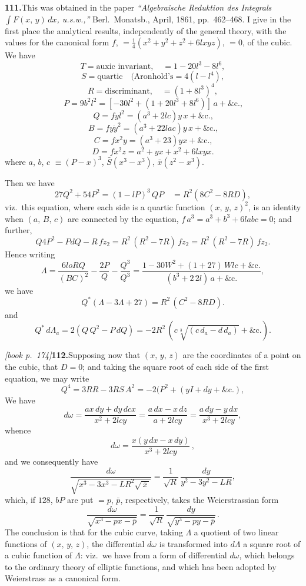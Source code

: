 \documentclass[11pt,a4paper]{article}
\begin{document}
\medskip\noindent\textbf{111.}\quad This was obtained in the paper \textit{``Algebraische Reduktion des Integrals $\int F(x,\,y)\,dx$, u.s.w.,''} Berl.\ Monatsb., April, 1861, pp.\ 462--468. I give in the first place the analytical results, independently of the general theory, with the values for the canonical form $f$, $= \frac{1}{4}(x^2 + y^2 + z^2 + 6lxyz)$, $= 0$, of the cubic. We have
\[
T = \text{auxic invariant},\quad = 1 - 20l^3 - 8l^6,
\]
\[
S = \text{quartic}\quad (\text{Aronhold's} = 4(l - l^4),
\]
\[
R = \text{discriminant},\quad = (1 + 8l^3)^4,
\]
\[
P = 9b^2 l^2 = [-30 l^2 + (1 + 20l^3 + 8l^6)]\,a + \&\text{c.,}
\]
\[
Q = f y l^2 = (a^3 + 2lc) y\,x + \&\text{c.,}
\]
\[
B = f y\dot{y}^2 = (a^3 + 22 lac) y\,x + \&\text{c.,}
\]
\[
C = f x^2 y = (a^3 + 23) y x + \&\text{c.,}
\]
\[
D = f x^2 z = a^2 + y x + x^2 + 6lx y x.
\]
where $a$, $b$, $c$ $\equiv (P - x)^3$, $\bar{S}(x^3 - x^3)$, $\bar{x}(z^2 - x^3)$.

Then we have
\[
27Q^2 + 54P^2 = (1 - lP)^3\,QP\quad = R^2(8C^2 - 8RD),
\]
viz.\ this equation, where each side is a quartic function $(x,\,y,\,z)^2$, is an identity when $(a,\,B,\,c)$ are connected by the equation, $f\,a^3 = a^3 + b^3 + 6la b c = 0$; and further,
\[
Q4P^2 - PdQ - R\,fz_2 = R^2\,(R^2 - 7R)\,fz_2 = R^2\,(R^2 - 7R)\,fz_2.
\]
Hence writing
\[
\Lambda = \frac{6loRQ}{(BC)^2} - \frac{2P}{Q} - \frac{Q^3}{Q^3} = \frac{1 - 30W^2 + (1 + 27)\,Wlc + \&\text{c.}}{(b^3 + 2\,2l)\,a + \&\text{c.}},
\]
we have
\[
Q^*(\Lambda - 3\Lambda + 27) = R^2\,(C^2 - 8RD).
\]
and
\[
Q^*\,d\Lambda_a = 2(Q\,Q^2 - P\,dQ) = -2R^2\,(c\sqrt[3]{(c\,d_a - d\,d_a)} + \&\text{c.}).
\]

\medskip\noindent\textit{[book p.~174]}\quad \textbf{112.}\quad Supposing now that $(x,\,y,\,z)$ are the coordinates of a point on the cubic, that $D = 0$; and taking the square root of each side of the first equation, we may write
\[
Q^4 = 3RR - 3RS\,A^2 = -2(P^2 + (yI + dy + \&\text{c.}),
\]
We have
\[
d\omega = \frac{ax\,dy + dy\,d c x}{x^2 + 2lcy} = \frac{a\,dx - x\,dz}{a + 2lcy} = \frac{a\,dy - y\,dx}{x^3 + 2lcy},
\]
whence
\[
d\omega = \frac{x(y\,dx - x\,dy)}{x^3 + 2lcy}\,,
\]
and we consequently have
\[
\frac{d\omega}{\sqrt{x^3 - 3x^3 - LR^2 \sqrt{\,\bar{x}\,}}} = \frac{1}{\sqrt{R}}\,\frac{dy}{y^2 - 3y^2 - LR},
\]
which, if $128$, $bP$ are put $= p$, $\bar{p}$, respectively, takes the Weierstrassian form
\[
\frac{d\omega}{\sqrt{x^3 - px - \bar{p}}} = \frac{1}{\sqrt{R}}\,\frac{dy}{\sqrt{y^3 - py - \bar{p}}}\,.
\]
The conclusion is that for the cubic curve, taking $\Lambda$ a quotient of two linear functions of $(x,\,y,\,z)$, the differential $d\omega$ is transformed into $d\Lambda$ a square root of a cubic function of $\Lambda$: viz.\ we have from a form of differential $d\omega$, which belongs to the ordinary theory of elliptic functions, and which has been adopted by Weierstrass as a canonical form.
\end{document}
